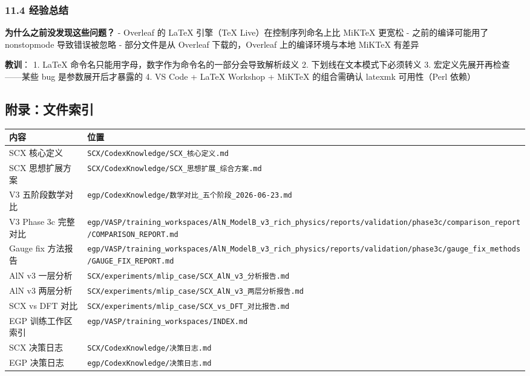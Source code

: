 \documentclass[
  12pt,
]{ctexart}
\begin{document}
\subsubsection{11.4 经验总结}\label{ux7ecfux9a8cux603bux7ed3}

\textbf{为什么之前没发现这些问题？} - Overleaf 的 LaTeX 引擎（TeX
Live）在控制序列命名上比 MiKTeX 更宽松 - 之前的编译可能用了 nonstopmode
导致错误被忽略 - 部分文件是从 Overleaf 下载的，Overleaf
上的编译环境与本地 MiKTeX 有差异

\textbf{教训}： 1. LaTeX
命令名只能用字母，数字作为命令名的一部分会导致解析歧义 2.
下划线在文本模式下必须转义 3. 宏定义先展开再检查------某些 bug
是参数展开后才暴露的 4. VS Code + LaTeX Workshop + MiKTeX 的组合需确认
latexmk 可用性（Perl 依赖）

\subsection{附录：文件索引}\label{ux9644ux5f55ux6587ux4ef6ux7d22ux5f15}

\begin{longtable}[]{@{}
  >{\raggedright\arraybackslash}p{}
  >{\raggedright\arraybackslash}p{}@{}}
\toprule\noalign{}
\begin{minipage}[b]{\linewidth}\raggedright
内容
\end{minipage} & \begin{minipage}[b]{\linewidth}\raggedright
位置
\end{minipage} \\
\midrule\noalign{}
\endhead
\bottomrule\noalign{}
\endlastfoot
SCX 核心定义 & \texttt{SCX/CodexKnowledge/SCX\_核心定义.md} \\
SCX 思想扩展方案 &
\texttt{SCX/CodexKnowledge/SCX\_思想扩展\_综合方案.md} \\
V3 五阶段数学对比 &
\texttt{egp/CodexKnowledge/数学对比\_五个阶段\_2026-06-23.md} \\
V3 Phase 3c 完整对比 &
\texttt{egp/VASP/training\_workspaces/AlN\_ModelB\_v3\_rich\_physics/reports/validation/phase3c/comparison\_report/COMPARISON\_REPORT.md} \\
Gauge fix 方法报告 &
\texttt{egp/VASP/training\_workspaces/AlN\_ModelB\_v3\_rich\_physics/reports/validation/phase3c/gauge\_fix\_methods/GAUGE\_FIX\_REPORT.md} \\
AlN v3 一层分析 &
\texttt{SCX/experiments/mlip\_case/SCX\_AlN\_v3\_分析报告.md} \\
AlN v3 两层分析 &
\texttt{SCX/experiments/mlip\_case/SCX\_AlN\_v3\_两层分析报告.md} \\
SCX vs DFT 对比 &
\texttt{SCX/experiments/mlip\_case/SCX\_vs\_DFT\_对比报告.md} \\
EGP 训练工作区索引 & \texttt{egp/VASP/training\_workspaces/INDEX.md} \\
SCX 决策日志 & \texttt{SCX/CodexKnowledge/决策日志.md} \\
EGP 决策日志 & \texttt{egp/CodexKnowledge/决策日志.md} \\
\end{longtable}
\end{document}

